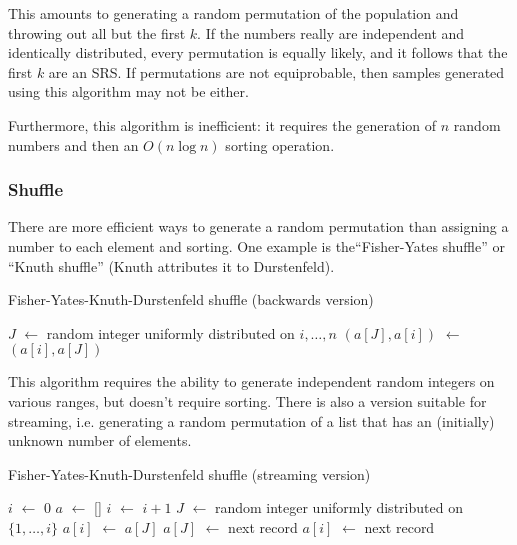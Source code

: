 \documentclass[12pt]{article}
\newcommand*\Let[2]{\State #1 $\gets$ #2}
\begin{document}
This amounts to generating a random permutation of the population and throwing out all but the first $k$.
If the numbers really are independent and identically distributed, every permutation is equally likely, and it follows that the first $k$ are an SRS.
If permutations are not equiprobable, then samples generated using this algorithm may not be either.

Furthermore, this algorithm is inefficient: it requires the generation of $n$ random numbers and then an $O(n\log n)$ sorting operation.

\subsubsection{Shuffle}
There are more efficient ways to generate a random permutation than assigning a number to each element and sorting.
One example is the``Fisher-Yates shuffle'' or ``Knuth shuffle'' (Knuth attributes it to Durstenfeld).

\begin{algorithm}                      %
\caption{Fisher-Yates-Knuth-Durstenfeld shuffle (backwards version)}          %
\label{FYKD}                           %
\begin{algorithmic}[1]               %
    \Let{$J$}{random integer uniformly distributed on $i, \dots, n$}
    \Let{$(a[J], a[i])$}{$(a[i], a[J])$}
\EndFor
\end{algorithmic}
\end{algorithm}

This algorithm requires the ability to generate independent random integers on various ranges, but doesn't require sorting.
There is also a version suitable for streaming, i.e. generating a random permutation of a list that has an (initially) unknown number of elements.

\begin{algorithm}                      %
\caption{Fisher-Yates-Knuth-Durstenfeld shuffle (streaming version)}          %
\label{FYKD-streaming}                           %
\begin{algorithmic}[1]               %
\Let{$i$}{0}
\Let{$a$}{[]}
    \Let{$i$}{$i+1$}
    \Let{$J$}{random integer uniformly distributed on $\{1, \dots, i\}$}
        \Let{$a[i]$}{$a[J]$}
        \Let{$a[J]$}{next record}
    \Else
        \Let{$a[i]$}{next record} 
    \EndIf
\EndWhile \\
\end{algorithmic}
\end{algorithm}
\end{document}
